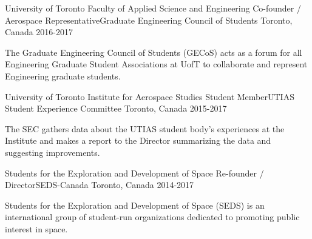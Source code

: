 \begin{cventries}
  \cventry
    {University of Toronto Faculty of Applied Science and Engineering} %
    {Co-founder / Aerospace Representative{\enskip\cdotp\enskip}Graduate Engineering Council of Students} %
    {Toronto, Canada} %
    {2016-2017} %
    {
      \begin{cvitems} %
        \item {The Graduate Engineering Council of Students (GECoS) acts as a forum for all Engineering Graduate Student Associations at UofT to collaborate and represent Engineering graduate students.}
      \end{cvitems}
    }

  \cventry
    {University of Toronto Institute for Aerospace Studies} %
    {Student Member{\enskip\cdotp\enskip}UTIAS Student Experience Committee} %
    {Toronto, Canada} %
    {2015-2017} %
    {
      \begin{cvitems} %
        \item {The SEC gathers data about the UTIAS student body's experiences at the Institute and makes a report to the Director summarizing the data and suggesting improvements.}
      \end{cvitems}
    }

  \cventry
    {Students for the Exploration and Development of Space} %
    {Re-founder / Director{\enskip\cdotp\enskip}SEDS-Canada} %
    {Toronto, Canada} %
    {2014-2017} %
    {
      \begin{cvitems} %
        \item {Students for the Exploration and Development of Space (SEDS) is an international group of student-run organizations dedicated to promoting public interest in space.}
      \end{cvitems}
    }
\end{cventries}
